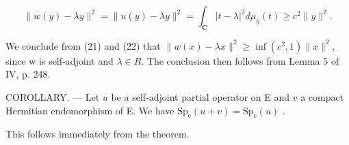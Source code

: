 \[
\| w (y) - \lambda y \| ^ {2} = \| u (y) - \lambda y \| ^ {2} = \int_ {\mathbf {C}} | t - \lambda | ^ {2} d \mu_ {y} (t) \geqslant c ^ {2} \| y \| ^ {2}.\tag{22}
\]

We conclude from (21) and (22) that \(\|w(x)-\lambda x\|^{2}\geqslant\inf(c^{2},1)\|x\|^{2}\), since w is self-adjoint and \(\lambda\in R\). The conclusion then follows from Lemma 5 of IV, p. 248.

COROLLARY. --- Let \(u\) be a self-adjoint partial operator on E and \(v\) a compact Hermitian endomorphism of E. We have \(\mathrm{Sp}_{\mathrm{e}}(u + v) = \mathrm{Sp}_{\mathrm{e}}(u)\) .

This follows immediately from the theorem.

